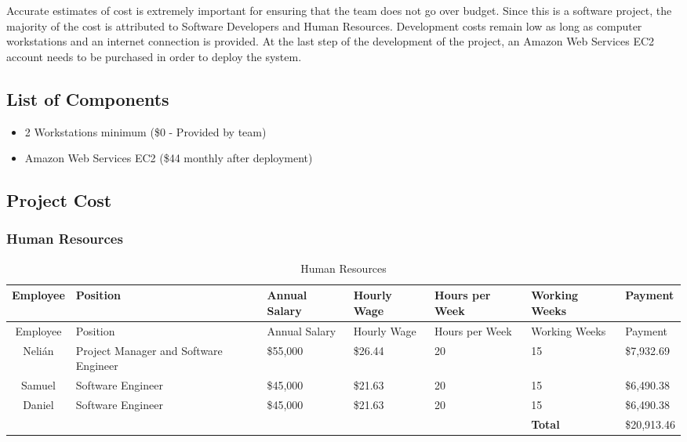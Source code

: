 \label{sec:Budget}

Accurate estimates of cost is extremely important for ensuring that the team
does not go over budget. Since this is a software project, the majority of the
cost is attributed to Software Developers and Human Resources. Development costs
remain low as long as computer workstations and an internet connection is
provided. At the last step of the development of the project, an Amazon Web
Services EC2 account needs to be purchased in order to deploy the system.

\subsection{List of Components}

\begin{itemize}
\item 2 Workstations minimum (\$0 - Provided by team)
\item Amazon Web Services EC2 (\$44 monthly after deployment)

\end{itemize}

\subsection{Project Cost}
\subsubsection{Human Resources}
\begin{center}
\setlength{\extrarowheight}{1.5pt}
  \begin{longtable}{|c|p{3.5cm}|p{1.5cm}|p{1cm}|p{1cm}|p{1.5cm}|p{2cm}|}
 \caption{Human Resources} \\
   \hline
  
  \centering Employee & Position & Annual Salary & Hourly Wage & Hours per Week & Working Weeks & Payment \\
  \hline \hline \endfirsthead
  
     \hline

	\centering Employee & Position & Annual Salary & Hourly Wage & Hours per Week & Working Weeks & Payment \\
	\hline \hline \endhead
  
  \endfoot  

    Nelián & Project Manager and Software Engineer & \$55,000  & \$26.44  & 20    & 15    & \$7,932.69  \\ \hline
    Samuel & Software Engineer & \$45,000  & \$21.63  & 20    & 15    & \$6,490.38  \\ \hline
    Daniel & Software Engineer & \$45,000  & \$21.63  & 20    & 15    & \$6,490.38  \\ \hline
    \multicolumn{1}{l}{}      & \multicolumn{1}{l}{}      & \multicolumn{1}{l}{}      & \multicolumn{1}{l}{}      & \multicolumn{1}{l}{}      & \multicolumn{1}{l}{\textbf{Total}} & \multicolumn{1}{l}{\$20,913.46}  \\
          
           \end{longtable}
\end{center}

